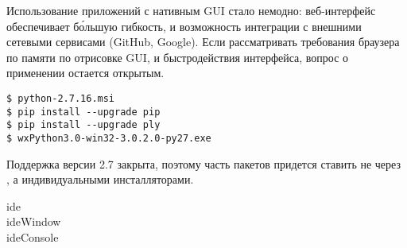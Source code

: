 \label{wx}\secdown

\noindent
Использование приложений с нативным GUI стало немодно: веб-интер\-фейс
обеспечивает б\'{о}льшую гибкость, и возможность
интеграции с внешними сетевыми сервисами (GitHub, Google). Если рассматривать
требования браузера по памяти по отрисовке GUI, и быстродействия интерфейса,
вопрос о применении  остается открытым.


\begin{verbatim}
$ python-2.7.16.msi
$ pip install --upgrade pip
$ pip install --upgrade ply
$ wxPython3.0-win32-3.0.2.0-py27.exe
\end{verbatim}

\noindent
Поддержка версии 2.7 закрыта, поэтому часть пакетов придется ставить не через
, а индивидуальными инсталляторами.


\clearpage
{}

\begin{description}
\item[ide]
\item[ideWindow]
\item[ideConsole]
\end{description}

\secup